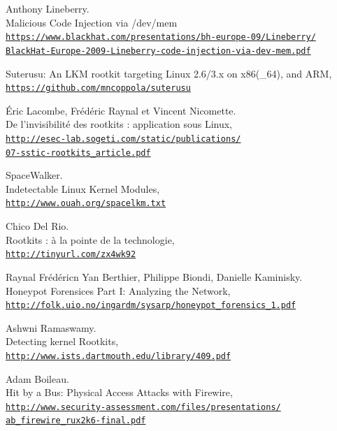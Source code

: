 \documentclass[12pt]{article}
\begin{document}
\begin{thebibliography}{9}
Anthony Lineberry. \\
Malicious Code Injection via /dev/mem
\\\href{https://www.blackhat.com/presentations/bh-europe-09/Lineberry/BlackHat-Europe-2009-Lineberry-code-injection-via-dev-mem.pdf}{\texttt{https://www.blackhat.com/presentations/bh-europe-09/Lineberry/
\\BlackHat-Europe-2009-Lineberry-code-injection-via-dev-mem.pdf}}

Suterusu: An LKM rootkit targeting Linux 2.6/3.x on x86(\_64), and ARM,
\\\href{https://github.com/mncoppola/suterusu}{\texttt{https://github.com/mncoppola/suterusu}}

Éric Lacombe, Frédéric Raynal et Vincent Nicomette.\\
De l’invisibilité des rootkits : application sous Linux,
\\\href{http://esec-lab.sogeti.com/static/publications/07-sstic-rootkits\_article.pdf}{\texttt{http://esec-lab.sogeti.com/static/publications/
\\07-sstic-rootkits\_article.pdf}}

SpaceWalker.\\
Indetectable Linux Kernel Modules,
\\\href{http://www.ouah.org/spacelkm.txt}{\texttt{http://www.ouah.org/spacelkm.txt}}

Chico Del Rio.\\
Rootkits : à la pointe de la technologie,
\\\href{http://tinyurl.com/zx4wk92}{\texttt{http://tinyurl.com/zx4wk92}}

Raynal Frédéricn Yan Berthier, Philippe Biondi, Danielle Kaminisky.\\
Honeypot Forensices Part I: Analyzing the Network,
\\\href{http://folk.uio.no/ingardm/sysarp/honeypot\_forensics\_1.pdf}{\texttt{http://folk.uio.no/ingardm/sysarp/honeypot\_forensics\_1.pdf}}

Ashwni Ramaswamy.\\
Detecting kernel Rootkits,
\\\href{http://www.ists.dartmouth.edu/library/409.pdf}{\texttt{http://www.ists.dartmouth.edu/library/409.pdf}}

Adam Boileau.\\
Hit by a Bus: Physical Access Attacks with Firewire,
\\\href{http://www.security-assessment.com/files/presentations/ab\_firewire\_rux2k6-final.pdf}{\texttt{http://www.security-assessment.com/files/presentations/
\\ab\_firewire\_rux2k6-final.pdf}}


\end{thebibliography}
\end{document}
